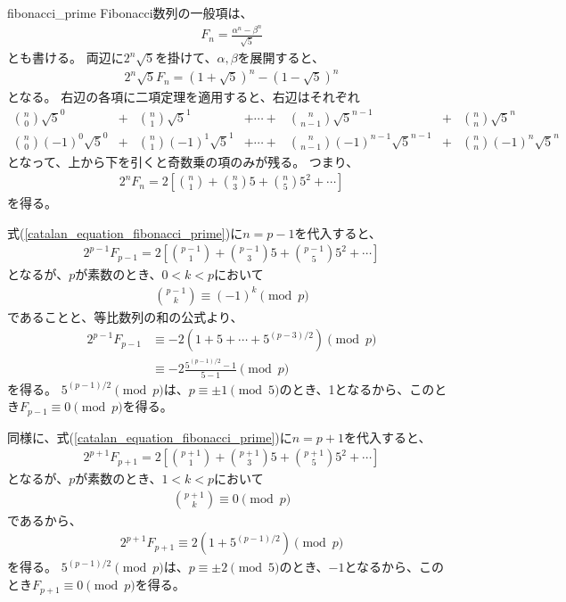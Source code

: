 \begin{thProof}{fibonacci_prime}
Fibonacci数列の一般項は、
\begin{align*}
F_n = \frac{\alpha^n - \beta^n}{\sqrt{5}}
\end{align*}
とも書ける。
両辺に$2^n\sqrt{5}$を掛けて、$\alpha,\beta$を展開すると、
\begin{align*}
2^n\sqrt{5}F_n = (1+\sqrt{5})^n - (1-\sqrt{5})^n
\end{align*}
となる。
右辺の各項に二項定理を適用すると、右辺はそれぞれ
\begin{align*}
{n \choose 0}\sqrt{5}^0       &+& {n \choose 1}\sqrt{5}^1       &+ \cdots +& {n \choose n-1}\sqrt{5}^{n-1}           &+& {n \choose n}\sqrt{5}^n\\
{n \choose 0}(-1)^0\sqrt{5}^0 &+& {n \choose 1}(-1)^1\sqrt{5}^1 &+ \cdots +& {n \choose n-1}(-1)^{n-1}\sqrt{5}^{n-1} &+& {n \choose n}(-1)^n\sqrt{5}^n
\end{align*}
となって、上から下を引くと奇数乗の項のみが残る。
つまり、
\begin{align}
\label{catalan_equation_fibonacci_prime}
2^n F_n = 2 \left[ {n \choose 1} + {n \choose 3}5 + {n \choose 5}5^2 + \cdots \right]
\end{align}
を得る。

式(\ref{catalan_equation_fibonacci_prime})に$n=p-1$を代入すると、
\begin{align*}
2^{p-1}F_{p-1} = 2 \left[ {p-1 \choose 1} + {p-1 \choose 3}5 + {p-1 \choose 5}5^2 + \cdots \right]
\end{align*}
となるが、$p$が素数のとき、$0 < k < p$において
\begin{align*}
{p-1 \choose k} \equiv (-1)^k \pmod{p}
\end{align*}
であることと、等比数列の和の公式より、
\begin{align*}
2^{p-1}F_{p-1} &\equiv -2 (1 + 5 + \cdots + 5^{(p-3)/2}) \pmod{p}\\
&\equiv -2 \frac{5^{(p-1)/2} - 1}{5-1}\pmod{p}
\end{align*}
を得る。
$5^{(p-1)/2}\pmod{p}$は、$p\equiv\pm1\pmod{5}$のとき、1となるから、このとき$F_{p-1}\equiv 0\pmod{p}$を得る。

同様に、式(\ref{catalan_equation_fibonacci_prime})に$n=p+1$を代入すると、
\begin{align*}
2^{p+1}F_{p+1} = 2 \left[ {p+1 \choose 1} + {p+1 \choose 3}5 + {p+1 \choose 5}5^2 + \cdots \right]
\end{align*}
となるが、$p$が素数のとき、$1 < k < p$において
\begin{align*}
{p+1 \choose k} \equiv 0 \pmod{p}
\end{align*}
であるから、
\begin{align*}
2^{p+1}F_{p+1} \equiv 2 (1 + 5^{(p-1)/2}) \pmod{p}
\end{align*}
を得る。
$5^{(p-1)/2}\pmod{p}$は、$p\equiv\pm2\pmod{5}$のとき、$-1$となるから、このとき$F_{p+1}\equiv 0\pmod{p}$を得る。
\end{thProof}
